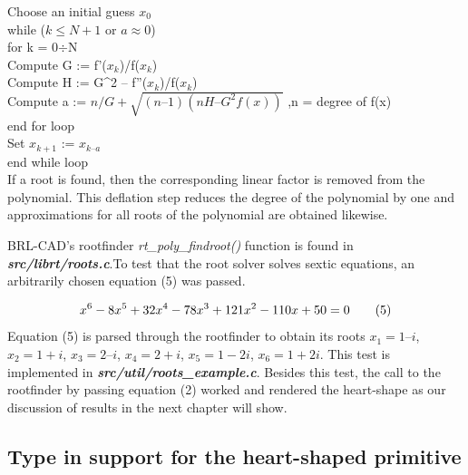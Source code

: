 Choose an initial guess $x_0$  \\
\hspace{40}while ($k \leq N+1$  or  $a \approx 0$) \\
\hspace{60}for k = 0$\div$N \\
\hspace{90}Compute  G := f'($x_k$)/f($x_k$) \\ 
\hspace{90}Compute  H := G^2 – f''($x_k$)/f($x_k$) \\ 
\hspace{90}Compute  a := $n/G + \sqrt{(n–1)(nH – G^2f(x))}$ ,n = degree of f(x) \\
\hspace{60}end for loop \\
\hspace{40}Set $x_{k+1}$ := $x_{k – a}$\\ 
\hspace{40}end while loop \\
If a root is found, then the corresponding linear factor is removed   from   the  
polynomial.   This   deflation   step   reduces   the   degree   of   the   polynomial   by   one  
and approximations for all roots of the polynomial are obtained likewise. 
 
\hspace{30} BRL-­CAD's   root­finder   \textit{rt\_poly\_findroot()}   function   is   found   in  
\textit{\textbf{src/librt/roots.c}}.To test that the   root  solver solves sextic  
equations, an arbitrarily chosen equation (5)  was passed.  

\begin{equation*}
\centering
 x^6 -­ 8x^5 + 32x^4 - 78x^3 + 121x^2 - ­110x + 50 = 0­­­­­ \tag{5}  
\end{equation*}
Equation (5) is parsed through the   root­finder   to   obtain   its   roots   $x_1 = 1 – i$, $x_2 = 1 + i$, $x_3 = 2 – i$, $x_4 = 2 +
i$, $x_5 = 1­ - 2i$, $x_6 = 1 + 2i$. This   test   is   implemented   in   \textit{\textbf{src/util/roots\_example.c}}.  
Besides   this   test,   the   call   to   the   root­finder   by passing equation (2)   worked   and   rendered   the  
heart-shape as our discussion of results in the next chapter will show.  

\subsection{Type in support for the heart-­shaped primitive}

